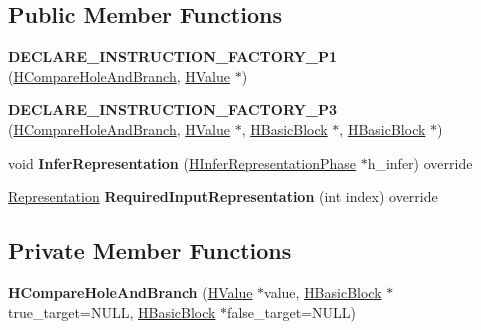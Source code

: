 \subsection*{Public Member Functions}
\begin{DoxyCompactItemize}
\item 
{\bfseries D\+E\+C\+L\+A\+R\+E\+\_\+\+I\+N\+S\+T\+R\+U\+C\+T\+I\+O\+N\+\_\+\+F\+A\+C\+T\+O\+R\+Y\+\_\+\+P1} (\hyperlink{classv8_1_1internal_1_1_h_compare_hole_and_branch}{H\+Compare\+Hole\+And\+Branch}, \hyperlink{classv8_1_1internal_1_1_h_value}{H\+Value} $\ast$)\hypertarget{classv8_1_1internal_1_1_h_compare_hole_and_branch_a8782c654a5696651621de23155686c06}{}\label{classv8_1_1internal_1_1_h_compare_hole_and_branch_a8782c654a5696651621de23155686c06}

\item 
{\bfseries D\+E\+C\+L\+A\+R\+E\+\_\+\+I\+N\+S\+T\+R\+U\+C\+T\+I\+O\+N\+\_\+\+F\+A\+C\+T\+O\+R\+Y\+\_\+\+P3} (\hyperlink{classv8_1_1internal_1_1_h_compare_hole_and_branch}{H\+Compare\+Hole\+And\+Branch}, \hyperlink{classv8_1_1internal_1_1_h_value}{H\+Value} $\ast$, \hyperlink{classv8_1_1internal_1_1_h_basic_block}{H\+Basic\+Block} $\ast$, \hyperlink{classv8_1_1internal_1_1_h_basic_block}{H\+Basic\+Block} $\ast$)\hypertarget{classv8_1_1internal_1_1_h_compare_hole_and_branch_a0a1e8bb4553974adf24f902b4b964c62}{}\label{classv8_1_1internal_1_1_h_compare_hole_and_branch_a0a1e8bb4553974adf24f902b4b964c62}

\item 
void {\bfseries Infer\+Representation} (\hyperlink{classv8_1_1internal_1_1_h_infer_representation_phase}{H\+Infer\+Representation\+Phase} $\ast$h\+\_\+infer) override\hypertarget{classv8_1_1internal_1_1_h_compare_hole_and_branch_ac4ea709ca5a7dfdca970e663422b0b77}{}\label{classv8_1_1internal_1_1_h_compare_hole_and_branch_ac4ea709ca5a7dfdca970e663422b0b77}

\item 
\hyperlink{classv8_1_1internal_1_1_representation}{Representation} {\bfseries Required\+Input\+Representation} (int index) override\hypertarget{classv8_1_1internal_1_1_h_compare_hole_and_branch_a1ee2cbbb6cdac8fb5a1279061c2b747d}{}\label{classv8_1_1internal_1_1_h_compare_hole_and_branch_a1ee2cbbb6cdac8fb5a1279061c2b747d}

\end{DoxyCompactItemize}
\subsection*{Private Member Functions}
\begin{DoxyCompactItemize}
\item 
{\bfseries H\+Compare\+Hole\+And\+Branch} (\hyperlink{classv8_1_1internal_1_1_h_value}{H\+Value} $\ast$value, \hyperlink{classv8_1_1internal_1_1_h_basic_block}{H\+Basic\+Block} $\ast$true\+\_\+target=N\+U\+LL, \hyperlink{classv8_1_1internal_1_1_h_basic_block}{H\+Basic\+Block} $\ast$false\+\_\+target=N\+U\+LL)\hypertarget{classv8_1_1internal_1_1_h_compare_hole_and_branch_a92588e7b0bddd5ce77816ffdaea9f128}{}\label{classv8_1_1internal_1_1_h_compare_hole_and_branch_a92588e7b0bddd5ce77816ffdaea9f128}

\end{DoxyCompactItemize}
